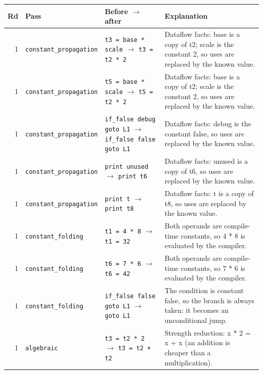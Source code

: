 \begin{longtable}{@{}rp{}p{}p{}@{}}\toprule
\textbf{Rd} & \textbf{Pass} & \textbf{Before} $\rightarrow$ \textbf{after} & \textbf{Explanation}\\ \midrule\endhead
1 & \texttt{constant\_propagation} & \texttt{\scriptsize t3 = base * scale} $\rightarrow$ \texttt{\scriptsize t3 = t2 * 2} & {\scriptsize Dataflow facts: base is a copy of t2; scale is the constant 2, so uses are replaced by the known value.}\\
1 & \texttt{constant\_propagation} & \texttt{\scriptsize t5 = base * scale} $\rightarrow$ \texttt{\scriptsize t5 = t2 * 2} & {\scriptsize Dataflow facts: base is a copy of t2; scale is the constant 2, so uses are replaced by the known value.}\\
1 & \texttt{constant\_propagation} & \texttt{\scriptsize if\_false debug goto L1} $\rightarrow$ \texttt{\scriptsize if\_false false goto L1} & {\scriptsize Dataflow facts: debug is the constant false, so uses are replaced by the known value.}\\
1 & \texttt{constant\_propagation} & \texttt{\scriptsize print unused} $\rightarrow$ \texttt{\scriptsize print t6} & {\scriptsize Dataflow facts: unused is a copy of t6, so uses are replaced by the known value.}\\
1 & \texttt{constant\_propagation} & \texttt{\scriptsize print t} $\rightarrow$ \texttt{\scriptsize print t8} & {\scriptsize Dataflow facts: t is a copy of t8, so uses are replaced by the known value.}\\
1 & \texttt{constant\_folding} & \texttt{\scriptsize t1 = 4 * 8} $\rightarrow$ \texttt{\scriptsize t1 = 32} & {\scriptsize Both operands are compile-time constants, so 4 * 8 is evaluated by the compiler.}\\
1 & \texttt{constant\_folding} & \texttt{\scriptsize t6 = 7 * 6} $\rightarrow$ \texttt{\scriptsize t6 = 42} & {\scriptsize Both operands are compile-time constants, so 7 * 6 is evaluated by the compiler.}\\
1 & \texttt{constant\_folding} & \texttt{\scriptsize if\_false false goto L1} $\rightarrow$ \texttt{\scriptsize goto L1} & {\scriptsize The condition is constant false, so the branch is always taken: it becomes an unconditional jump.}\\
1 & \texttt{algebraic} & \texttt{\scriptsize t3 = t2 * 2} $\rightarrow$ \texttt{\scriptsize t3 = t2 + t2} & {\scriptsize Strength reduction: x * 2 = x + x (an addition is cheaper than a multiplication).}\\

\end{longtable}
